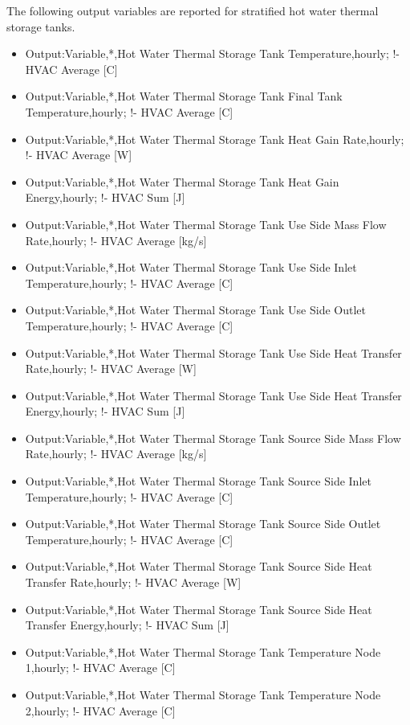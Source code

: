 The following output variables are reported for stratified hot water thermal storage tanks.

\begin{itemize}
\item Output:Variable,*,Hot Water Thermal Storage Tank Temperature,hourly; !- HVAC Average {[}C{]}
\item Output:Variable,*,Hot Water Thermal Storage Tank Final Tank Temperature,hourly; !- HVAC Average {[}C{]}
\item Output:Variable,*,Hot Water Thermal Storage Tank Heat Gain Rate,hourly; !- HVAC Average {[}W{]}
\item Output:Variable,*,Hot Water Thermal Storage Tank Heat Gain Energy,hourly; !- HVAC Sum {[}J{]}
\item Output:Variable,*,Hot Water Thermal Storage Tank Use Side Mass Flow Rate,hourly; !- HVAC Average {[}kg/s{]}
\item Output:Variable,*,Hot Water Thermal Storage Tank Use Side Inlet Temperature,hourly; !- HVAC Average {[}C{]}
\item Output:Variable,*,Hot Water Thermal Storage Tank Use Side Outlet Temperature,hourly; !- HVAC Average {[}C{]}
\item Output:Variable,*,Hot Water Thermal Storage Tank Use Side Heat Transfer Rate,hourly; !- HVAC Average {[}W{]}
\item Output:Variable,*,Hot Water Thermal Storage Tank Use Side Heat Transfer Energy,hourly; !- HVAC Sum {[}J{]}
\item Output:Variable,*,Hot Water Thermal Storage Tank Source Side Mass Flow Rate,hourly; !- HVAC Average {[}kg/s{]}
\item Output:Variable,*,Hot Water Thermal Storage Tank Source Side Inlet Temperature,hourly; !- HVAC Average {[}C{]}
\item Output:Variable,*,Hot Water Thermal Storage Tank Source Side Outlet Temperature,hourly; !- HVAC Average {[}C{]}
\item Output:Variable,*,Hot Water Thermal Storage Tank Source Side Heat Transfer Rate,hourly; !- HVAC Average {[}W{]}
\item Output:Variable,*,Hot Water Thermal Storage Tank Source Side Heat Transfer Energy,hourly; !- HVAC Sum {[}J{]}
\item Output:Variable,*,Hot Water Thermal Storage Tank Temperature Node 1,hourly; !- HVAC Average {[}C{]}
\item Output:Variable,*,Hot Water Thermal Storage Tank Temperature Node 2,hourly; !- HVAC Average {[}C{]}

\end{itemize}
